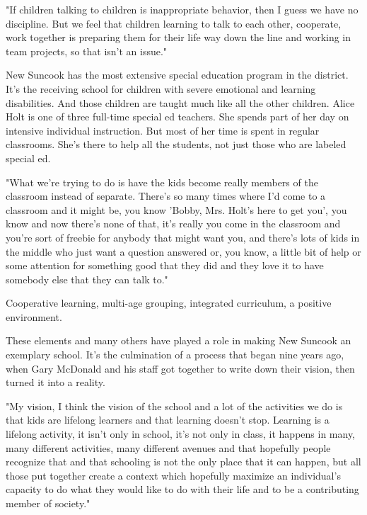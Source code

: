 "If children talking to children is inappropriate behavior, then I guess we have no discipline. But we feel that children learning to talk to each other, cooperate, work together is preparing them for their life way down the line and working in team projects, so that isn't an issue."

New Suncook has the most extensive special education program in the district. It's the receiving school for children with severe emotional and learning disabilities. And those children are taught much like all the other children. Alice Holt is one of three full-time special ed teachers. She spends part of her day on intensive individual instruction. But most of her time is spent in regular classrooms. She's there to help all the students, not just those who are labeled special ed.

"What we're trying to do is have the kids become really members of the classroom instead of separate. There's so many times where I'd come to a classroom and it might be, you know 'Bobby, Mrs. Holt's here to get you', you know and now there's none of that, it's really you come in the classroom and you're sort of freebie for anybody that might want you, and there's lots of kids in the middle who just want a question answered or, you know, a little bit of help or some attention for something good that they did and they love it to have somebody else that they can talk to."

Cooperative learning, multi-age grouping, integrated curriculum, a positive environment.

These elements and many others have played a role in making New Suncook an exemplary school. It's the culmination of a process that began nine years ago, when Gary McDonald and his staff got together to write down their vision, then turned it into a reality.

"My vision, I think the vision of the school and a lot of the activities we do is that kids are lifelong learners and that learning doesn't stop. Learning is a lifelong activity, it isn't only in school, it's not only in class, it happens in many, many different activities, many different avenues and that hopefully people recognize that and that schooling is not the only place that it can happen, but all those put together create a context which hopefully maximize an individual's capacity to do what they would like to do with their life and to be a contributing member of society."